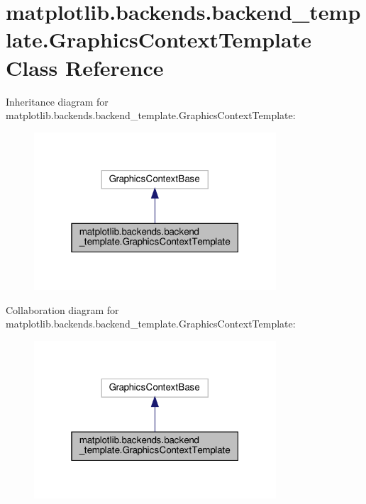 \hypertarget{classmatplotlib_1_1backends_1_1backend__template_1_1GraphicsContextTemplate}{}\section{matplotlib.\+backends.\+backend\+\_\+template.\+Graphics\+Context\+Template Class Reference}
\label{classmatplotlib_1_1backends_1_1backend__template_1_1GraphicsContextTemplate}


Inheritance diagram for matplotlib.\+backends.\+backend\+\_\+template.\+Graphics\+Context\+Template\+:
\nopagebreak
\begin{figure}[H]
\begin{center}
\leavevmode
\includegraphics[width=256pt]{classmatplotlib_1_1backends_1_1backend__template_1_1GraphicsContextTemplate__inherit__graph}
\end{center}
\end{figure}


Collaboration diagram for matplotlib.\+backends.\+backend\+\_\+template.\+Graphics\+Context\+Template\+:
\nopagebreak
\begin{figure}[H]
\begin{center}
\leavevmode
\includegraphics[width=256pt]{classmatplotlib_1_1backends_1_1backend__template_1_1GraphicsContextTemplate__coll__graph}
\end{center}
\end{figure}



